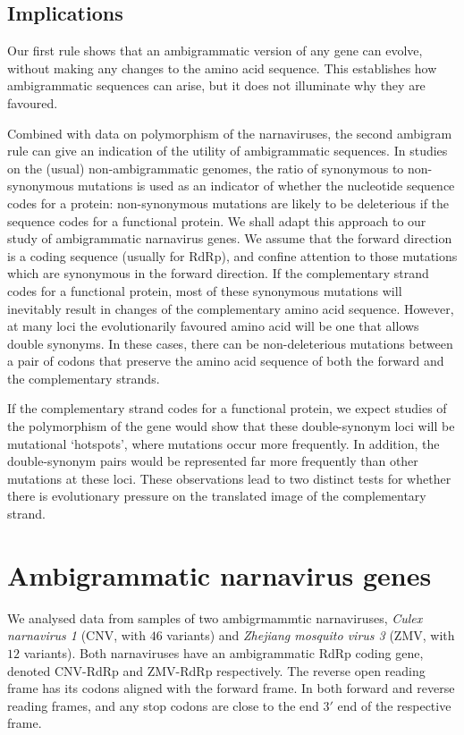 \documentclass[unnumsec,webpdf,contemporary,large,namedate]{oup-authoring-template}%
\theoremstyle{thmstyleone}%
\theoremstyle{thmstyletwo}%
\theoremstyle{thmstylethree}%
\begin{document}
\subsection{Implications}
\label{sec: 2.3}

Our first rule shows that an ambigrammatic version of any gene can evolve, without 
making any changes to the amino acid sequence. This establishes how ambigrammatic sequences 
can arise, but it does not illuminate why they are favoured. 

Combined with data on polymorphism of the narnaviruses, the second ambigram rule can give an 
indication of the utility of ambigrammatic sequences. In studies on the (usual) non-ambigrammatic 
genomes, the ratio of synonymous to non-synonymous mutations is used as an indicator of 
whether the nucleotide sequence codes for a protein: non-synonymous mutations 
are likely to be deleterious if the sequence codes for a functional protein. 
We shall adapt this approach to our study of ambigrammatic narnavirus genes.
We assume that the forward direction is a coding sequence (usually for RdRp), 
and confine attention to those mutations which are synonymous in the forward 
direction. If the complementary strand codes for a functional protein, most of these 
synonymous mutations will inevitably result in changes of the complementary 
amino acid sequence. However, at many loci the evolutionarily favoured amino acid 
will be one that allows double synonyms. In these cases, there can be 
non-deleterious mutations between a pair of codons that preserve the amino acid 
sequence of both the forward and the 
complementary strands.   

If the complementary strand codes for a functional protein, we expect studies of the 
polymorphism of the gene would show that these double-synonym loci will be 
mutational \lq hotspots', where mutations occur more frequently. In addition, the double-synonym pairs 
would be represented far more frequently than other mutations at these loci. These observations 
lead to two distinct tests for whether there is evolutionary pressure on the translated image of the 
complementary strand.

\section{Ambigrammatic narnavirus genes}
\label{sec: 3}

We analysed data from samples of two ambigrmammtic narnaviruses, 
\emph{Culex narnavirus 1} (CNV, with $46$ variants) and \emph{Zhejiang mosquito virus 3} (ZMV, with 
$12$ variants). Both narnaviruses have an ambigrammatic RdRp coding gene, denoted CNV-RdRp and 
ZMV-RdRp respectively. The reverse open reading frame has its codons aligned with the forward frame. 
In both forward and reverse reading frames, and any stop codons are close to the end $3'$ end of the
respective frame.
\end{document}
